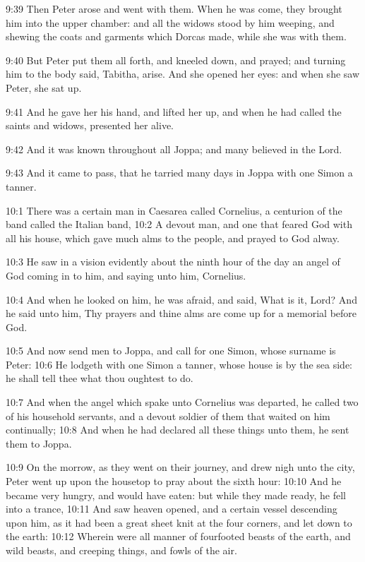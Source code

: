 9:39 Then Peter arose and went with them. When he was come, they
brought him into the upper chamber: and all the widows stood by him
weeping, and shewing the coats and garments which Dorcas made, while
she was with them.

9:40 But Peter put them all forth, and kneeled down, and prayed; and
turning him to the body said, Tabitha, arise. And she opened her eyes:
and when she saw Peter, she sat up.

9:41 And he gave her his hand, and lifted her up, and when he had
called the saints and widows, presented her alive.

9:42 And it was known throughout all Joppa; and many believed in the
Lord.

9:43 And it came to pass, that he tarried many days in Joppa with one
Simon a tanner.

10:1 There was a certain man in Caesarea called Cornelius, a centurion
of the band called the Italian band, 10:2 A devout man, and one that
feared God with all his house, which gave much alms to the people, and
prayed to God alway.

10:3 He saw in a vision evidently about the ninth hour of the day an
angel of God coming in to him, and saying unto him, Cornelius.

10:4 And when he looked on him, he was afraid, and said, What is it,
Lord?  And he said unto him, Thy prayers and thine alms are come up
for a memorial before God.

10:5 And now send men to Joppa, and call for one Simon, whose surname
is Peter: 10:6 He lodgeth with one Simon a tanner, whose house is by
the sea side: he shall tell thee what thou oughtest to do.

10:7 And when the angel which spake unto Cornelius was departed, he
called two of his household servants, and a devout soldier of them
that waited on him continually; 10:8 And when he had declared all
these things unto them, he sent them to Joppa.

10:9 On the morrow, as they went on their journey, and drew nigh unto
the city, Peter went up upon the housetop to pray about the sixth
hour: 10:10 And he became very hungry, and would have eaten: but while
they made ready, he fell into a trance, 10:11 And saw heaven opened,
and a certain vessel descending upon him, as it had been a great sheet
knit at the four corners, and let down to the earth: 10:12 Wherein
were all manner of fourfooted beasts of the earth, and wild beasts,
and creeping things, and fowls of the air.

